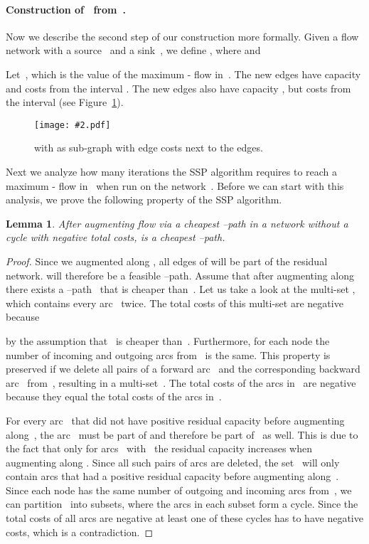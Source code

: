 \documentclass[11pt]{article}
\newtheorem{lemma}[theorem]{Lemma}
\newcommand{\GFX}[2][]{\texttt{[image: \#2.pdf]}}
\newenvironment{fig}
{\begin{figure}[th]\begin{center}}
{\end{center}\end{figure}}
\begin{document}
\paragraph{\boldmath Construction of~ from~.}
Now we describe the second step of our construction more formally. Given a flow network  with a source~ and a sink~, we define , where  and

Let~, which is the value of the maximum - flow in~. The new edges  have capacity  and costs from the interval . The new edges  also have capacity , but costs from the interval  (see Figure~\ref{fig:step II}).


\begin{fig}
  \GFX[width=0.5\textwidth]{Iteration1}
 \caption[]
   { with  as sub-graph with edge costs next to the edges.}
  \label{fig:step II}
\end{fig}

Next we analyze how many iterations the SSP algorithm requires to reach a maximum - flow in~ when run on the network~.
Before we can start with this analysis, we prove the following property of the SSP algorithm.
\begin{lemma}
\label{lemma: shortest backward path} 
After augmenting flow via a cheapest --path  in a network without a cycle with negative total costs,  is a cheapest --path. 
\end{lemma}
\begin{proof}
Since we augmented along , all edges of  will be part of the residual network.  will therefore be a feasible --path.
Assume that after augmenting along~ there exists a --path~
that is cheaper than~.
Let us take a look at the multi-set , which contains every arc~ twice.
The total costs of this multi-set are negative because
 
by the assumption that~ is cheaper than~.
Furthermore, for each node the number of incoming and outgoing arcs from~ is the same.
This property is preserved if we delete all pairs of a forward arc~ and the corresponding 
backward arc~ from~, resulting in a multi-set~.
The total costs of the arcs in~ are negative because they equal the total costs of the arcs in~.  

For every arc~ that did not have positive residual capacity before augmenting along~, the arc~ must be part of  and therefore be part of~ as well.
This is due to the fact that only for arcs~ with~ the residual capacity increases when augmenting along .
Since all such pairs of arcs are deleted, the set~ will only contain arcs that had a positive residual capacity
before augmenting along~. Since each node has the same number of outgoing and
incoming arcs from~, we can partition~ into subsets, where the arcs in each subset
form a cycle. Since the total costs of all arcs are negative at
least one of these cycles has to have negative costs, which is a contradiction.
\end{proof}
\end{document}
